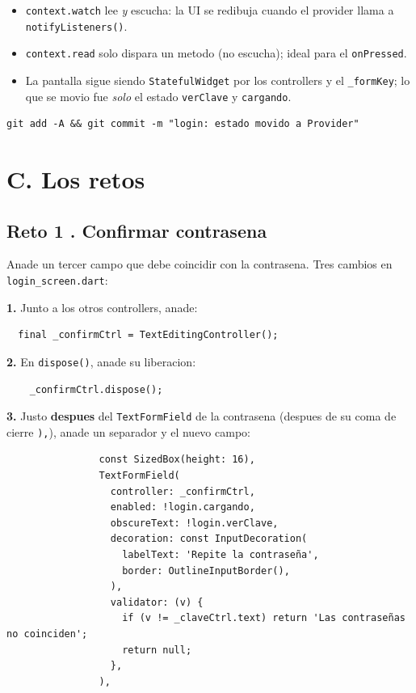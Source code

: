 \documentclass[11pt,a4paper,oneside]{book}
\newcommand{\file}[1]{\texttt{\textcolor{brandDark}{#1}}}
\begin{document}
\begin{whatbox}
\begin{itemize}
  \item \texttt{context.watch} lee \emph{y} escucha: la UI se redibuja cuando el
        provider llama a \texttt{notifyListeners()}.
  \item \texttt{context.read} solo dispara un metodo (no escucha); ideal para el
        \texttt{onPressed}.
  \item La pantalla sigue siendo \texttt{StatefulWidget} por los controllers y el
        \texttt{\_formKey}; lo que se movio fue \emph{solo} el estado \texttt{verClave}
        y \texttt{cargando}.
\end{itemize}
\end{whatbox}

\begin{lstlisting}[language={},numbers=none]
git add -A && git commit -m "login: estado movido a Provider"
\end{lstlisting}

\section*{C. Los retos}

\subsection*{Reto 1 . Confirmar contrasena}
Anade un tercer campo que debe coincidir con la contrasena. Tres cambios en
\file{login\_screen.dart}:

\noindent\textbf{1.} Junto a los otros controllers, anade:
\begin{lstlisting}
  final _confirmCtrl = TextEditingController();
\end{lstlisting}

\noindent\textbf{2.} En \texttt{dispose()}, anade su liberacion:
\begin{lstlisting}
    _confirmCtrl.dispose();
\end{lstlisting}

\noindent\textbf{3.} Justo \textbf{despues} del \texttt{TextFormField} de la
contrasena (despues de su coma de cierre \texttt{),}), anade un separador y el nuevo
campo:
\begin{lstlisting}
                const SizedBox(height: 16),
                TextFormField(
                  controller: _confirmCtrl,
                  enabled: !login.cargando,
                  obscureText: !login.verClave,
                  decoration: const InputDecoration(
                    labelText: 'Repite la contraseña',
                    border: OutlineInputBorder(),
                  ),
                  validator: (v) {
                    if (v != _claveCtrl.text) return 'Las contraseñas no coinciden';
                    return null;
                  },
                ),
\end{lstlisting}
\end{document}

